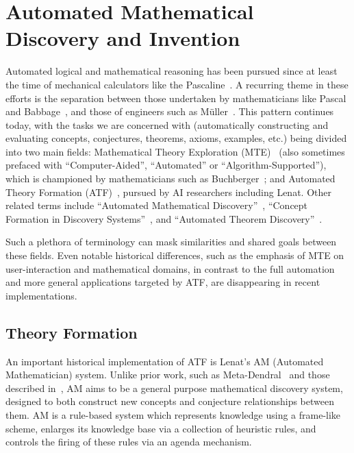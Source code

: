 \section{Automated Mathematical Discovery and Invention}

Automated logical and mathematical reasoning has been pursued since at least the
time of mechanical calculators like the
Pascaline~\cite{ocagne93:_le_calcul_simpl}. A recurring theme in these efforts
is the separation between those undertaken by mathematicians like Pascal and
Babbage~\cite{bowden}, and those of engineers such as
M\"uller~\cite[p. 65]{lindgren}. This pattern continues today, with the tasks we
are concerned with (automatically constructing and evaluating concepts,
conjectures, theorems, axioms, examples, etc.) being divided into two main
fields: Mathematical Theory Exploration (MTE)~\cite{buchberger:06} (also
sometimes prefaced with ``Computer-Aided'', ``Automated'' or
``Algorithm-Supported''), which is championed by mathematicians such as
Buchberger~\cite{buchberger}; and Automated Theory Formation
(ATF)~\cite{lenat:77,colton:book}, pursued by AI researchers including Lenat.
Other related terms include ``Automated Mathematical
Discovery''~\cite{epstein:91,colton2000notion,esarm2008}, ``Concept Formation in
Discovery Systems''~\cite{haase}, and ``Automated Theorem
Discovery''~\cite{roy}.

Such a plethora of terminology can mask similarities and shared goals between
these fields. Even notable historical differences, such as the emphasis of MTE
on user-interaction and mathematical domains, in contrast to the full automation
and more general applications targeted by ATF, are disappearing in recent
implementations.

\subsection{Theory Formation}

An important historical implementation of ATF is Lenat's AM (Automated
Mathematician) system. Unlike prior work, such as
Meta-Dendral~\cite{buchanan:75} and those described in~\cite{winston}, AM aims
to be a general purpose mathematical discovery system, designed to both
construct new concepts and conjecture relationships between them. AM is a
rule-based system which represents knowledge using a frame-like scheme, enlarges
its knowledge base via a collection of heuristic rules, and controls the firing
of these rules via an agenda mechanism.

